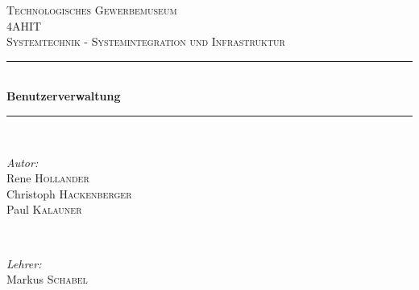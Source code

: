 \documentclass[main.tex]{subfiles}
\begin{document}
\newcommand{\HRule}{\rule{\linewidth}{0.5mm}} %

\center %


\textsc{\LARGE Technologisches Gewerbemuseum}\\[1.5cm] %
\textsc{\Large 4AHIT}\\[0.5cm] %
\textsc{\large Systemtechnik - Systemintegration und Infrastruktur}\\[0.5cm] %


\HRule \\[0.4cm]
{ \huge \bfseries Benutzerverwaltung} %
\HRule \\[1.5cm]


\begin{minipage}{0.5\textwidth}
	\begin{flushleft} \large
		\emph{Autor:}\\
		Rene \textsc{Hollander}\\
		Christoph \textsc{Hackenberger}\\
		Paul \textsc{Kalauner}
	\end{flushleft}
\end{minipage}
~
\begin{minipage}{0.4\textwidth}
	\begin{flushright} \large
		\emph{Lehrer:} \\
		Markus \textsc{Schabel} %
	\end{flushright}
\end{minipage}\\[2cm]

\end{document}
